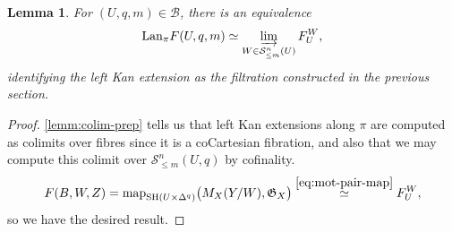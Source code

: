 \documentclass[11pt, twoside]{article}
\numberwithin{equation}{section}
\newtheorem{lemma}[equation]{Lemma}
\theoremstyle{definition}
\newcommand{\colim}{\varinjlim}
\newcommand{\mf}[1]{\mathfrak{#1}}
\newcommand{\map}{\mathrm{map}}
\newcommand{\sh}{\mathrm{SH}}
\newcommand{\lan}{\mathrm{Lan}}
\begin{document}
\begin{lemma}
For \((U, q, m) \in \mathcal{B}\), there is an equivalence 
\[\lan_\pi F(U, q, m) \simeq \colim_{W \in \mathcal{S}_{\leq m}^n(U)} F_U^W,\]
identifying the left Kan extension as the filtration constructed in the previous section.
\end{lemma}

\begin{proof}
\ref{lemm:colim-prep} tells us that left Kan extensions along \(\pi\) are computed as colimits over fibres since it is a coCartesian fibration, and also that we may compute this colimit over \(\mathcal{S}_{\leq m}^n(U, q)\) by cofinality. 
\[F(B, W, Z) = \map_{\sh(U \times \Delta^q)}\big(M_X(Y/W), \mf{G}_X\big) \stackrel{\ref{eq:mot-pair-map}} \simeq F_U^W,\]
so we have the desired result.
\end{proof}
\end{document}
